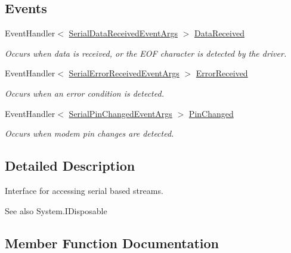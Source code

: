 \subsection*{Events}
\begin{DoxyCompactItemize}
\item 
Event\+Handler$<$ \mbox{\hyperlink{class_r_j_c_p_1_1_i_o_1_1_ports_1_1_serial_data_received_event_args}{Serial\+Data\+Received\+Event\+Args}} $>$ \mbox{\hyperlink{interface_r_j_c_p_1_1_i_o_1_1_ports_1_1_native_1_1_i_native_serial_ac178188add6061e0a9913fb0240f16ed}{Data\+Received}}
\begin{DoxyCompactList}\small\item\em Occurs when data is received, or the E\+OF character is detected by the driver. \end{DoxyCompactList}\item 
Event\+Handler$<$ \mbox{\hyperlink{class_r_j_c_p_1_1_i_o_1_1_ports_1_1_serial_error_received_event_args}{Serial\+Error\+Received\+Event\+Args}} $>$ \mbox{\hyperlink{interface_r_j_c_p_1_1_i_o_1_1_ports_1_1_native_1_1_i_native_serial_ada6f81da52ba3cff2a6b638472d271c6}{Error\+Received}}
\begin{DoxyCompactList}\small\item\em Occurs when an error condition is detected. \end{DoxyCompactList}\item 
Event\+Handler$<$ \mbox{\hyperlink{class_r_j_c_p_1_1_i_o_1_1_ports_1_1_serial_pin_changed_event_args}{Serial\+Pin\+Changed\+Event\+Args}} $>$ \mbox{\hyperlink{interface_r_j_c_p_1_1_i_o_1_1_ports_1_1_native_1_1_i_native_serial_a1f934013b560395e908d2bf93dc9b914}{Pin\+Changed}}
\begin{DoxyCompactList}\small\item\em Occurs when modem pin changes are detected. \end{DoxyCompactList}\end{DoxyCompactItemize}


\subsection{Detailed Description}
Interface for accessing serial based streams. 

\begin{DoxySeeAlso}{See also}
System.\+I\+Disposable


\end{DoxySeeAlso}


\subsection{Member Function Documentation}
\mbox{\label{interface_r_j_c_p_1_1_i_o_1_1_ports_1_1_native_1_1_i_native_serial_adb88604917c61a951ee180962aa81ce1}} 
